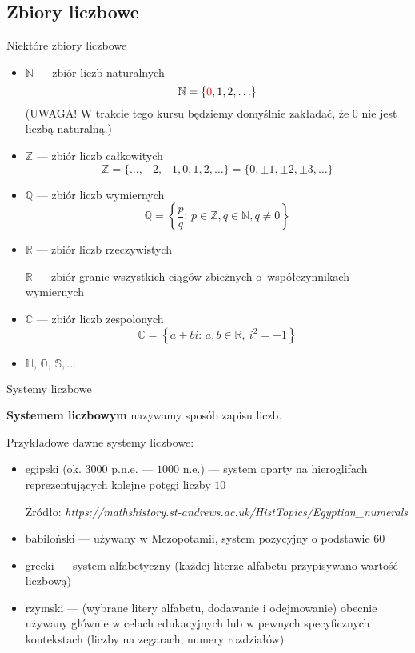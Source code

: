 \documentclass[a4paper,10pt]{beamer}
\begin{document}
\subsection{Zbiory liczbowe}


\begin{frame}{Niektóre zbiory liczbowe}
\begin{itemize}
\item $\mathbb{N}$ --- zbiór liczb naturalnych
$$\mathbb{N}=\{\textcolor{red}{0},1,2,\ldots\}$$ 
(UWAGA! W trakcie tego kursu będziemy domyślnie zakładać, że $0$ nie jest liczbą naturalną.)
\item $\mathbb{Z}$ --- zbiór liczb całkowitych
$$\mathbb{Z}=\{\ldots,-2,-1,0,1,2,\ldots\}=\{0,\pm1,\pm2,\pm3,\ldots\}$$
\item $\mathbb{Q}$ --- zbiór liczb wymiernych
$$\mathbb{Q}=\left\{\frac{p}q:\,p\in\mathbb{Z},q\in\mathbb{N},q\neq0\right\}$$
\item $\mathbb{R}$ --- zbiór liczb rzeczywistych

\begin{center}
$\mathbb{R}$ --- zbiór granic wszystkich ciągów zbieżnych o~współczynnikach wymiernych
\end{center}
\item $\mathbb{C}$ --- zbiór liczb zespolonych
$$\mathbb{C}=\left\{a+bi:\,a,b\in\mathbb{R},\ i^2=-1\right\}$$
\item $\mathbb{H},\,\mathbb{O},\,\mathbb{S},\ldots$
\end{itemize}
\end{frame}






\begin{frame}{Systemy liczbowe}
	
 {\bf Systemem liczbowym} nazywamy sposób zapisu liczb.

\bigskip

Przykładowe dawne systemy liczbowe:
\begin{itemize}
\item egipski (ok. $3000$ p.n.e. --- $1000$ n.e.) --- system oparty na hieroglifach reprezentujących kolejne potęgi liczby $10$
\begin{center}


{\footnotesize Źródło: {\it https://mathshistory.st-andrews.ac.uk/HistTopics/Egyptian\_numerals}}
\end{center}
\item babiloński --- używany w Mezopotamii, system pozycyjny o podstawie $60$
\item grecki --- system alfabetyczny (każdej literze alfabetu przypisywano wartość liczbową) %
\item rzymski --- (wybrane litery alfabetu, dodawanie i odejmowanie) obecnie używany głównie w celach edukacyjnych lub w pewnych specyficznych kontekstach (liczby na zegarach, numery rozdziałów)
\end{itemize}



\end{frame}
\end{document}
